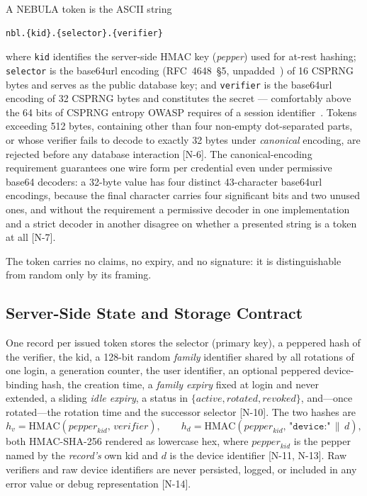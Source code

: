 \documentclass[11pt]{article}
\begin{document}
A NEBULA token is the ASCII string
\begin{lstlisting}
nbl.{kid}.{selector}.{verifier}
\end{lstlisting}
where \texttt{kid} identifies the server-side HMAC key (\emph{pepper}) used
for at-rest hashing; \texttt{selector} is the base64url encoding
(RFC~4648~\S5, unpadded~\cite{rfc4648}) of 16 CSPRNG bytes and serves as the
public database key; and \texttt{verifier} is the base64url encoding of 32
CSPRNG bytes and constitutes the secret --- comfortably above the 64 bits of
CSPRNG entropy OWASP requires of a session
identifier~\cite{owasp-session}. Tokens exceeding 512 bytes,
containing other than four non-empty dot-separated parts, or whose verifier
fails to decode to exactly 32 bytes under \emph{canonical} encoding, are
rejected before any database interaction [N-6]. The canonical-encoding
requirement guarantees one wire form per credential even under permissive
base64 decoders: a 32-byte value has four distinct 43-character base64url
encodings, because the final character carries four significant bits and two
unused ones, and without the requirement a permissive decoder in one
implementation and a strict decoder in another disagree on whether a
presented string is a token at all [N-7].

The token carries no claims, no expiry, and no signature: it is
distinguishable from random only by its framing.

\subsection{Server-Side State and Storage Contract}
\label{sec:state}

One record per issued token stores the selector (primary key), a peppered
hash of the verifier, the kid, a 128-bit random \emph{family} identifier
shared by all rotations of one login, a generation counter, the user
identifier, an optional peppered device-binding hash, the creation time, a
\emph{family expiry} fixed at login and never extended, a sliding \emph{idle
expiry}, a status in $\{\textit{active}, \textit{rotated},
\textit{revoked}\}$, and---once rotated---the rotation time and the
successor selector [N-10]. The two hashes are
\begin{equation*}
  h_v = \mathrm{HMAC}(\mathit{pepper}_{kid},\, \mathit{verifier}),
  \qquad
  h_d = \mathrm{HMAC}(\mathit{pepper}_{kid},\, \texttt{"device:"} \,\|\, d),
\end{equation*}
both HMAC-SHA-256 rendered as lowercase hex, where $\mathit{pepper}_{kid}$
is the pepper named by the \emph{record's} own kid and $d$ is the device
identifier [N-11, N-13]. Raw verifiers and raw device identifiers are never
persisted, logged, or included in any error value or debug representation
[N-14].
\end{document}
